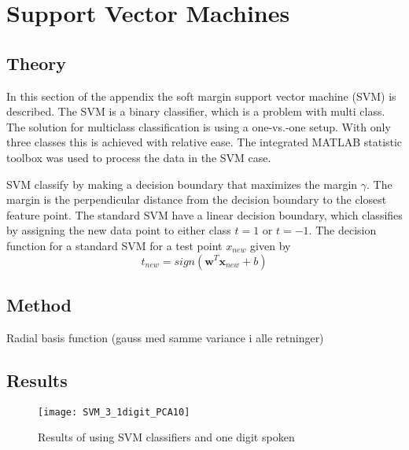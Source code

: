 \chapter{Support Vector Machines}
\section{Theory}
In this section of the appendix the soft margin support vector machine (SVM) is described. The SVM is a binary classifier, which is a problem with multi class. 
The solution for multiclass classification is using a one-vs.-one setup.
With only three classes this is achieved with relative ease. 
The integrated MATLAB statistic toolbox was used to process the data in the SVM case. 

SVM classify by making a decision boundary that maximizes the margin $ \gamma $.
The margin is the perpendicular distance from the decision boundary to the closest feature point.
The standard SVM have a linear decision boundary, which classifies by assigning the new data point to either class $ t=1 $ or $ t=-1 $. 
The decision function for a standard SVM for a test point $ x_{new} $ given by
\begin{equation}
t_{new} = sign(\mathbf{w}^T \mathbf{x}_{new} +b)
\end{equation}
 
\section{Method}
Radial basis function (gauss med samme variance i alle retninger) 
\section{Results}

\begin{figure}[H]
\centering
\texttt{[image: SVM\_3\_1digit\_PCA10]}
\caption{Results of using SVM classifiers and one digit spoken}
\label{fig:SVM3_1dig_PCA}
\end{figure}

